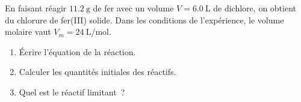 En faisant réagir $\qty{11.2}{\g}$ de fer avec un volume $V=\qty{6.0}{\L}$ de
dichlore, on obtient du chlorure de fer(III) solide. Dans les conditions de
l'expérience, le volume molaire vaut $V_{m}=\qty{24}{\L\per\mol}$.
\begin{enumerate}
    \item Écrire l'équation de la réaction.
    \item Calculer les quantités initiales des réactifs.
    \item Quel est le réactif limitant~?
\end{enumerate}
